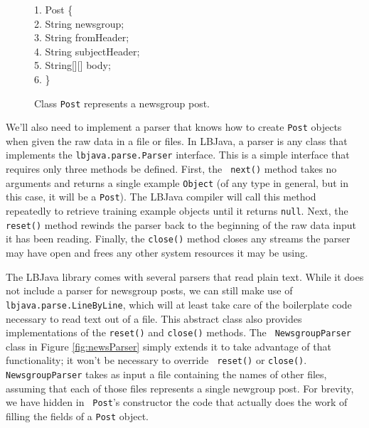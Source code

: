 \begin{figure}[t]
\begin{code}
1.  Post \{\\
2. \> {\color{BrickRed} String} newsgroup; \\
3. \> {\color{BrickRed} String} fromHeader;\\
4. \> {\color{BrickRed} String} subjectHeader;\\
5. \> {\color{BrickRed} String}[][] body;\\
6. \>\}
\end{code}
\caption{Class {\tt Post} represents a newsgroup post.}
\label{fig:post}
\end{figure}

We'll also need to implement a parser that knows how to create {\tt Post}
objects when given the raw data in a file or files.  In LBJava, a parser is any
class that implements the {\tt lbjava.parse.Parser} interface.  This is a simple
interface that requires only three methods be defined.  First, the {\tt
next()} method takes no arguments and returns a single example {\tt Object}
(of any type in general, but in this case, it will be a {\tt Post}).  The LBJava
compiler will call this method repeatedly to retrieve training example objects
until it returns {\tt null}.  Next, the {\tt reset()} method rewinds the
parser back to the beginning of the raw data input it has been reading.
Finally, the {\tt close()} method closes any streams the parser may have open
and frees any other system resources it may be using.

The LBJava library comes with several parsers that read plain text.  While it
does not include a parser for newsgroup posts, we can still make use of {\tt
lbjava.parse.LineByLine}, which will at least take care of the boilerplate code
necessary to read text out of a file.  This abstract class also provides
implementations of the {\tt reset()} and {\tt close()} methods.  The {\tt
NewsgroupParser} class in Figure \ref{fig:newsParser} simply extends it to
take advantage of that functionality; it won't be necessary to override {\tt
reset()} or {\tt close()}.  {\tt NewsgroupParser} takes as input a file
containing the names of other files, assuming that each of those files
represents a single newgroup post.  For brevity, we have hidden in {\tt
Post}'s constructor the code that actually does the work of filling the fields
of a {\tt Post} object.

